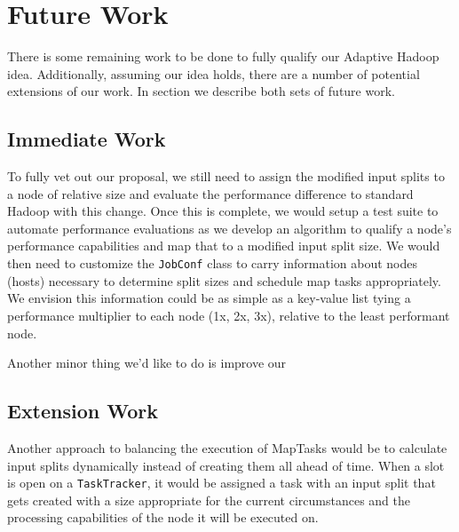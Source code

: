 \section{Future Work}
\label{section:futurework}

There is some remaining work to be done to fully qualify our Adaptive Hadoop idea. Additionally, 
assuming our idea holds, there are a number of potential extensions of our work. In section we
describe both sets of future work.

\subsection{Immediate Work}
To fully vet out our proposal, we still need to assign the modified input splits to a node
of relative size and evaluate the performance difference to standard Hadoop with this change.
Once this is complete, we would setup a test suite to automate performance evaluations as we
develop an algorithm to qualify a node's performance capabilities and map that to a modified
input split size. We would then need to customize the \texttt{JobConf} class to carry
information about nodes (hosts) necessary to determine split sizes and schedule map tasks
appropriately. We envision this information could be as simple as a key-value list tying
a performance multiplier to each node (1x, 2x, 3x), relative to the least performant node.

Another minor thing we'd like to do is improve our 

\subsection{Extension Work}
Another approach to balancing the execution of MapTasks would be to calculate input splits
dynamically instead of creating them all ahead of time. When a slot is open on a \texttt{TaskTracker}, it would
be assigned a task with an input split that gets created with a size appropriate for the current circumstances
and the processing capabilities of the node it will be executed on.